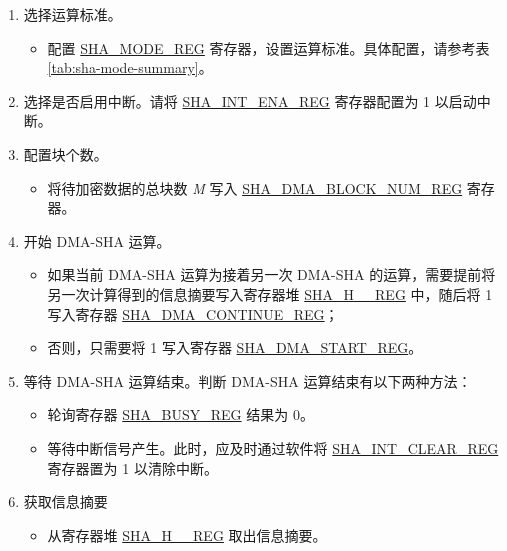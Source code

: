 \documentclass[main\_\_CN.tex]{subfiles}
\begin{document}
\begin{enumerate}
    \item 选择运算标准。
    \begin{itemize}
        \item 配置 \hyperref[regdesc:SHAMODEREG]{SHA\_MODE\_REG} 寄存器，设置运算标准。具体配置，请参考表 \ref{tab:sha-mode-summary}。
    \end{itemize}
    \item 选择是否启用中断。请将 \hyperref[regdesc:SHAINTENAREG]{SHA\_INT\_ENA\_REG} 寄存器配置为 1 以启动中断。
    \item 配置块个数。
    \begin{itemize}
        \item  将待加密数据的总块数 {\it{M}} 写入  \hyperref[regdesc:SHADMABLOCKNUMREG]{SHA\_DMA\_BLOCK\_NUM\_REG} 寄存器。
    \end{itemize}
    \item 开始 DMA-SHA 运算。
        \begin{itemize}
            \item 如果当前 DMA-SHA 运算为接着另一次 DMA-SHA 的运算，需要提前将另一次计算得到的信息摘要写入寄存器堆 \hyperref[regdesc:SHAHNREG]{SHA\_H\_\_REG} 中，随后将 1 写入寄存器 \hyperref[regdesc:SHADMACONTINUEREG]{SHA\_DMA\_CONTINUE\_REG}；
            \item 否则，只需要将 1 写入寄存器 \hyperref[regdesc:SHADMASTARTREG]{SHA\_DMA\_START\_REG}。
        \end{itemize}
    \item 等待 DMA-SHA 运算结束。判断 DMA-SHA 运算结束有以下两种方法：
        \begin{itemize}
            \item 轮询寄存器 \hyperref[regdesc:SHABUSYREG]{SHA\_BUSY\_REG} 结果为 0。
            \item 等待中断信号产生。此时，应及时通过软件将 \hyperref[regdesc:SHAINTCLEARREG]{SHA\_INT\_CLEAR\_REG} 寄存器置为 1 以清除中断。
        \end{itemize}

    \item 获取信息摘要
    \begin{itemize}
        \item 从寄存器堆 \hyperref[regdesc:SHAHNREG]{SHA\_H\_\_REG} 取出信息摘要。
    \end{itemize}

\end{enumerate}

\end{document}

